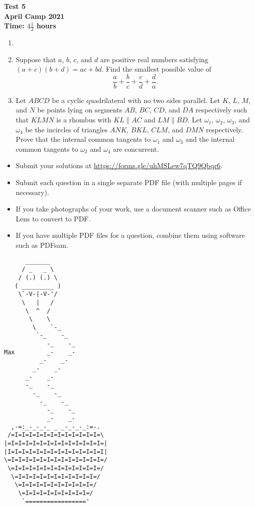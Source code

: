 \documentclass{article}
\begin{document}
\thispagestyle{empty}

\begin{center}
  \textbf{\Large Test 5}
  \\ \vspace{1em}
  \textbf{\large April Camp 2021}
  \\ \vspace{1em}
  \textbf{\large Time: $4\frac{1}{2}$ hours}
\end{center}

\vfill

\begin{enumerate}[leftmargin=0pt, itemsep=18pt]

\item


\item %
Suppose that $a$, $b$, $c$, and $d$ are positive real numbers satisfying $(a+c) (b+d) = ac +bd$.
Find the smallest possible value of
\[ \frac{a}{b} +\frac{b}{c} +\frac{c}{d} +\frac{d}{a}. \]


\item %
Let $ABCD$ be a cyclic quadrilateral with no two sides parallel.
Let $K$, $L$, $M$, and $N$ be points lying on segments $AB$, $BC$, $CD$, and $DA$ respectively such that $KLMN$ is a rhombus with $KL \parallel AC$ and $LM \parallel BD$.
Let $\omega_1$, $\omega_2$, $\omega_3$, and $\omega_4$ be the incircles of triangles $ANK$, $BKL$, $CLM$, and $DMN$ respectively.
Prove that the internal common tangents to $\omega_1$ and $\omega_3$ and the internal common tangents to $\omega_2$ and $\omega_4$ are concurrent.

\end{enumerate}


\vfill
\vfill
\begin{itemize}
	\item Submit your solutions at \url{https://forms.gle/uhMSLew7qTQ9Qbqr6}.
	\item Submit each question in a single separate PDF file (with multiple pages if necessary).
	\item If you take photographs of your work, use a document scanner such as Office Lens to convert to PDF.
	\item If you have multiple PDF files for a question, combine them using software such as PDFsam.
\end{itemize}

\vfill
\centering
\scriptsize
\begin{BVerbatim}
      _______
     / _   _ \
    / (.) (.) \
   ( _________ )
    \`-V-|-V-'/
     \   |   /
      \  ^  /
       \    \
        \    `-_
         `-_    -_
            -_    -_
Max         _-    _-
          _-    _-
        _-    _-
      _-    _-
      -_    -_
        -_    -_
          -_    -_
            -_    -_
            _-    _-
  ,-=:_-_-_-_ _ _-_-_-_:=-.
 /=I=I=I=I=I=I=I=I=I=I=I=I=\
|=I=I=I=I=I=I=I=I=I=I=I=I=I=|
|I=I=I=I=I=I=I=I=I=I=I=I=I=I|
\=I=I=I=I=I=I=I=I=I=I=I=I=I=/
 \=I=I=I=I=I=I=I=I=I=I=I=I=/
  \=I=I=I=I=I=I=I=I=I=I=I=/
   \=I=I=I=I=I=I=I=I=I=I=/
    \=I=I=I=I=I=I=I=I=I=/
     `================='
\end{BVerbatim}
\end{document}
